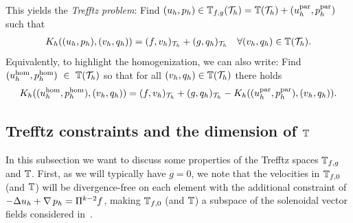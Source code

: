 \documentclass[pdflatex,sn-mathphys,Numbered]{sn-jnl}%
\theoremstyle{remark}%
\theoremstyle{definition}%
\begin{document}
This yields the \emph{Trefftz problem}: Find $(u_h,p_h) \in \mathbb{T}_{f,g}({\mathcal{T}_h})
=  \mathbb{T}({\mathcal{T}_h}) + (u_{h}^{\textrm{par}},p_{h}^{\textrm{par}})$ such that
\begin{align} \label{eq:discreteTrefftz}
  K_h((u_h,p_h),(v_h,q_h)) = (f,v_h)_{{\mathcal{T}_h}} + (g,q_h)_{{\mathcal{T}_h}}\quad \forall (v_h,q_h) \in \mathbb{T}({\mathcal{T}_h}).
\end{align}
Equivalently, to highlight the homogenization, we can also write:
Find $(u_{h}^{\textrm{hom}},p_{h}^{\textrm{hom}})~\in~\mathbb{T}({\mathcal{T}_h})$ so that for all $(v_h,q_h) \in \mathbb{T}({\mathcal{T}_h})$ there holds 
\begin{align} \label{eq:discreteTrefftz0}
  K_h((u_{h}^{\textrm{hom}},p_{h}^{\textrm{hom}}),(v_{h},q_{h})) = (f,v_h)_{{\mathcal{T}_h}} + (g,q_h)_{{\mathcal{T}_h}} - K_h((u_{h}^{\textrm{par}},p_{h}^{\textrm{par}}),(v_{h},q_{h})).
\end{align}


\subsection{Trefftz constraints and the dimension of
\texorpdfstring{$\mathbb{T}$}{T}} \label{sec:dofs} In this subsection we want
to discuss some properties of the Trefftz spaces $\mathbb{T}_{f,g}$ and
$\mathbb{T}$. First, as we will typically have $g=0$, we note that the
velocities in $\mathbb{T}_{f,0}$ (and $\mathbb{T}$) will be divergence-free on each
element with the additional constraint of $-\Delta u_h+\operatorname{\nabla} p_h=
\Pi^{k-2} f$, making $\mathbb{T}_{f,0}$ (and $\mathbb{T}$) a subspace of the
solenoidal vector fields considered in~\cite{BJK90,montlaur2010discontinuous}.
\end{document}
